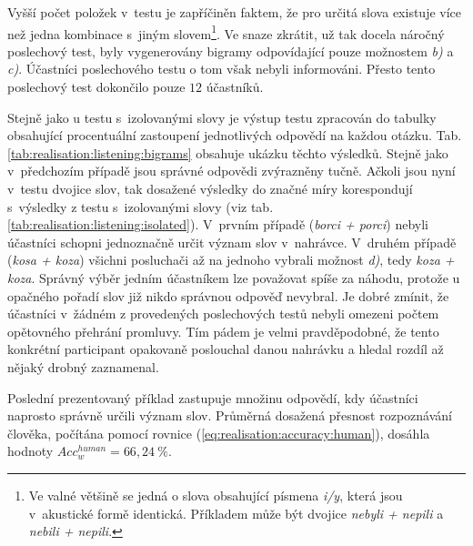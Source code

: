 Vyšší počet položek v~testu je zapříčiněn faktem, že pro určitá slova existuje více než jedna kombinace s~jiným slovem\footnote{Ve valné většině se jedná o slova obsahující písmena \textit{i/y}, která jsou v~akustické formě identická. Příkladem může být dvojice \textit{nebyli + nepili} a \textit{nebili + nepili}.}. Ve snaze zkrátit, už tak docela náročný poslechový test, byly vygenerovány bigramy odpovídající pouze možnostem \textit{b)} a \textit{c)}. Účastníci poslechového testu o tom však nebyli informováni. Přesto tento poslechový test dokončilo pouze $12$ účastníků.

Stejně jako u testu s~izolovanými slovy je výstup testu zpracován do tabulky obsahující procentuální zastoupení jednotlivých odpovědí na každou otázku.
Tab. \ref{tab:realisation:listening:bigrams} obsahuje ukázku těchto výsledků.
Stejně jako v~předchozím případě jsou správné odpovědi zvýrazněny tučně.
Ačkoli jsou nyní v~testu dvojice slov, tak dosažené výsledky do značné míry korespondují s~výsledky z testu s~izolovanými slovy (viz tab. \ref{tab:realisation:listening:isolated}).
V~prvním případě (\textit{borci + porci}) nebyli účastníci schopni jednoznačně určit význam slov v~nahrávce.
V~druhém případě (\textit{kosa + koza}) všichni posluchači až na jednoho vybrali možnost \textit{d)}, tedy \textit{koza + koza}.
Správný výběr jedním účastníkem lze považovat spíše za náhodu, protože u opačného pořadí slov již nikdo správnou odpověď nevybral.
Je dobré zmínit, že účastníci v~žádném z provedených poslechových testů nebyli omezeni počtem opětovného přehrání promluvy.
Tím pádem je velmi pravděpodobné, že tento konkrétní participant opakovaně poslouchal danou nahrávku a hledal rozdíl až nějaký drobný zaznamenal.

Poslední prezentovaný příklad zastupuje množinu odpovědí, kdy účastníci naprosto správně určili význam slov.
Průměrná dosažená přesnost rozpoznávání člověka, počítána pomocí rovnice (\ref{eq:realisation:accuracy:human}), dosáhla hodnoty $Acc_{w}^{human} = 66,24~\%$.

